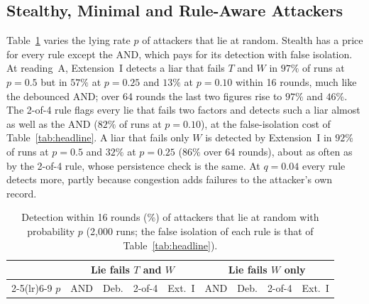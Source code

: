 \subsection{Stealthy, Minimal and Rule-Aware Attackers}
\label{sec:res-stealth}
Table~\ref{tab:stealth} varies the lying rate $p$ of attackers that lie
at random.  Stealth has a price for every rule except the AND, which
pays for its detection with false isolation.  At reading~A,
Extension~I detects a liar that fails $T$ and $W$ in $97\%$ of runs at
$p=0.5$ but in $57\%$ at $p=0.25$ and $13\%$ at $p=0.10$ within
16 rounds, much like the debounced AND; over 64 rounds the last two
figures rise to $97\%$ and $46\%$.  The 2-of-4 rule flags every lie
that fails two factors and detects such a liar almost as well as the
AND ($82\%$ of runs at $p=0.10$), at the false-isolation cost of
Table~\ref{tab:headline}.  A liar that fails only $W$ is
detected by Extension~I in $92\%$ of runs at $p=0.5$ and $32\%$ at
$p=0.25$ ($86\%$ over 64 rounds), about as often as by the 2-of-4
rule, whose persistence check is the same.  At $q=0.04$ every rule detects more, partly because
congestion adds failures to the attacker's own record.

\begin{table}[!t]
\caption{Detection within 16 rounds (\%) of attackers that lie at random with probability $p$ (2{,}000 runs; the false isolation of each rule is that of Table~\ref{tab:headline}).}
\label{tab:stealth}
\centering
\renewcommand{\arraystretch}{1.08}
\footnotesize
\setlength{\tabcolsep}{1.6pt}
\begin{tabular}{lrrrrrrrr}
\toprule
 & \multicolumn{4}{c}{\textbf{Lie fails $T$ and $W$}} & \multicolumn{4}{c}{\textbf{Lie fails $W$ only}} \\
\cmidrule(lr){2-5}\cmidrule(lr){6-9}
$p$ & AND & Deb. & 2-of-4 & Ext.~I & AND & Deb. & 2-of-4 & Ext.~I \\
\midrule
\bottomrule
\end{tabular}
\end{table}

